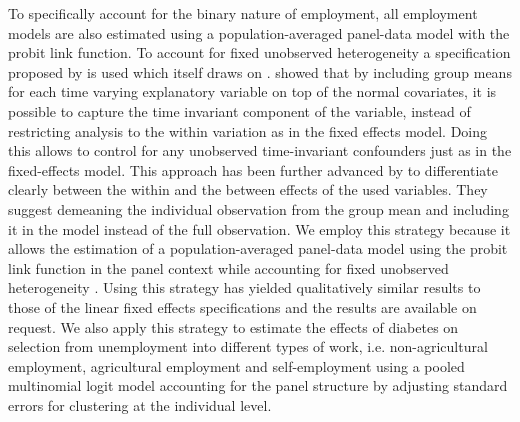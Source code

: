 To specifically account for the binary nature of employment, all employment
models are also estimated using a population-averaged panel-data model
with the probit link function. To account for fixed unobserved heterogeneity
a specification proposed by \citet{Bell2015} is used which itself
draws on \citet{Mundlak1978}. \citet{Mundlak1978} showed that by
including group means for each time varying explanatory variable on
top of the normal covariates, it is possible to capture the time invariant
component of the variable, instead of restricting analysis to the
within variation as in the fixed effects model. Doing this allows
to control for any unobserved time-invariant confounders just as in
the fixed-effects model. This approach has been further advanced by
\citet{Bell2015} to differentiate clearly between the within and
the between effects of the used variables. They suggest demeaning
the individual observation from the group mean and including it in
the model instead of the full observation. We employ this strategy
because it allows the estimation of a population-averaged panel-data
model using the probit link function in the panel context while accounting
for fixed unobserved heterogeneity \citep{Dieleman2014}. Using this
strategy has yielded qualitatively similar results to those of the
linear fixed effects specifications and the results are available
on request. We also apply this strategy to estimate the effects of diabetes on selection from unemployment into different types of work, i.e. non-agricultural employment, agricultural employment and self-employment using a pooled multinomial logit model accounting for the panel structure by adjusting standard errors for clustering at the individual level.


